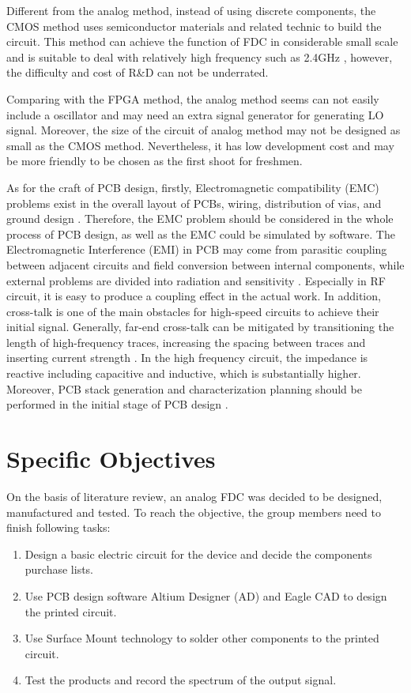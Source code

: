\documentclass[12pt, a4paper]{report}
\begin{document}
Different from the analog method, instead of using discrete components, the CMOS method uses semiconductor materials and related technic to build the circuit. This method can achieve the function of FDC in considerable small scale and is suitable to deal with relatively high frequency such as 2.4GHz \cite{cmos}, however, the difficulty and cost of R&D can not be underrated. 

Comparing with the FPGA method, the analog method seems can not easily include a oscillator and may need an extra signal generator for generating LO signal. Moreover, the size of the circuit of analog method may not be designed as small as the CMOS method. Nevertheless, it has low development cost and may be more friendly to be chosen as the first shoot for freshmen.

As for the craft of PCB design, firstly, Electromagnetic compatibility (EMC) problems exist in the overall layout of PCBs, wiring, distribution of vias, and ground design \cite{ref:l0}. Therefore, the EMC problem should be considered in the whole process of PCB design, as well as the EMC could be simulated by software. The Electromagnetic Interference (EMI) in PCB may come from parasitic coupling between adjacent circuits and field conversion between internal components, while external problems are divided into radiation and sensitivity \cite{ref:l0}. Especially in RF circuit, it is easy to produce a coupling effect in the actual work. In addition, cross-talk is one of the main obstacles for high-speed circuits to achieve their initial signal. Generally, far-end cross-talk can be mitigated by transitioning the length of high-frequency traces, increasing the spacing between traces and inserting current strength \cite{ref:l1}. In the high frequency circuit, the impedance is reactive including capacitive and inductive, which is substantially higher. Moreover, PCB stack generation and characterization planning should be performed in the initial stage of PCB design \cite{ref:l2}.

\section{Specific Objectives}
On the basis of literature review, an analog FDC was decided to be designed, manufactured and tested. To reach the objective, the group members need to finish following tasks:
\begin{enumerate}
\item Design a basic electric circuit for the device and decide the components purchase lists.
\item Use PCB design software Altium Designer (AD) and Eagle CAD to design the printed circuit.
\item Use Surface Mount technology to solder other components to the printed circuit.
\item Test the products and record the spectrum of the output signal. 
\end{enumerate}
\end{document}
